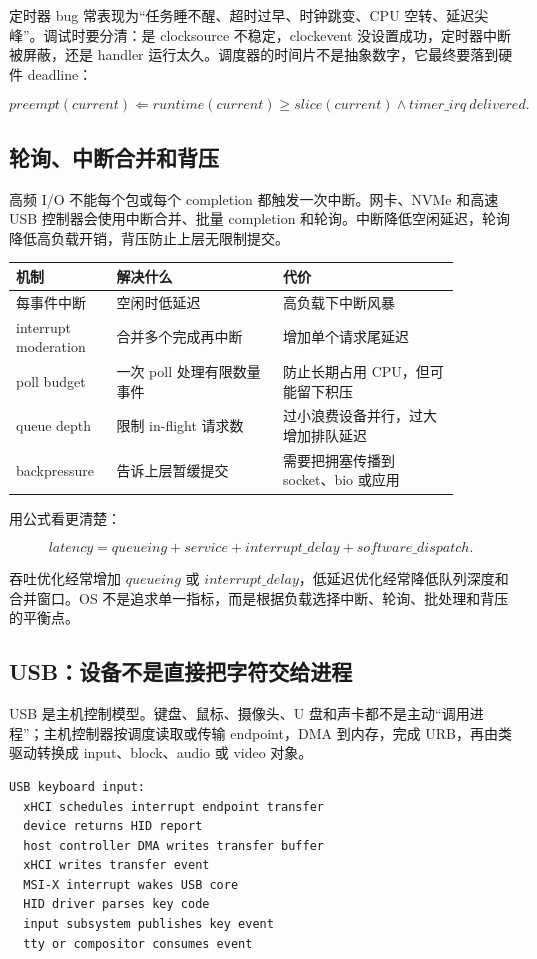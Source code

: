 定时器 bug 常表现为“任务睡不醒、超时过早、时钟跳变、CPU 空转、延迟尖峰”。调试时要分清：是 clocksource 不稳定，clockevent 没设置成功，定时器中断被屏蔽，还是 handler 运行太久。调度器的时间片不是抽象数字，它最终要落到硬件 deadline：

\[
preempt(current) \Leftarrow runtime(current) \ge slice(current)
\land timer\_irq\ delivered.
\]

\subsection{轮询、中断合并和背压}

高频 I/O 不能每个包或每个 completion 都触发一次中断。网卡、NVMe 和高速 USB 控制器会使用中断合并、批量 completion 和轮询。中断降低空闲延迟，轮询降低高负载开销，背压防止上层无限制提交。

\begin{longtable}{p{0.18\linewidth}p{0.34\linewidth}p{0.36\linewidth}}
\toprule
机制 & 解决什么 & 代价 \\
\midrule
每事件中断 & 空闲时低延迟 & 高负载下中断风暴 \\
interrupt moderation & 合并多个完成再中断 & 增加单个请求尾延迟 \\
poll budget & 一次 poll 处理有限数量事件 & 防止长期占用 CPU，但可能留下积压 \\
queue depth & 限制 in-flight 请求数 & 过小浪费设备并行，过大增加排队延迟 \\
backpressure & 告诉上层暂缓提交 & 需要把拥塞传播到 socket、bio 或应用 \\
\bottomrule
\end{longtable}

用公式看更清楚：

\[
latency = queueing + service + interrupt\_delay + software\_dispatch.
\]

吞吐优化经常增加 \(queueing\) 或 \(interrupt\_delay\)，低延迟优化经常降低队列深度和合并窗口。OS 不是追求单一指标，而是根据负载选择中断、轮询、批处理和背压的平衡点。

\subsection{USB：设备不是直接把字符交给进程}

USB 是主机控制模型。键盘、鼠标、摄像头、U 盘和声卡都不是主动“调用进程”；主机控制器按调度读取或传输 endpoint，DMA 到内存，完成 URB，再由类驱动转换成 input、block、audio 或 video 对象。

\begin{lstlisting}
USB keyboard input:
  xHCI schedules interrupt endpoint transfer
  device returns HID report
  host controller DMA writes transfer buffer
  xHCI writes transfer event
  MSI-X interrupt wakes USB core
  HID driver parses key code
  input subsystem publishes key event
  tty or compositor consumes event
\end{lstlisting}

